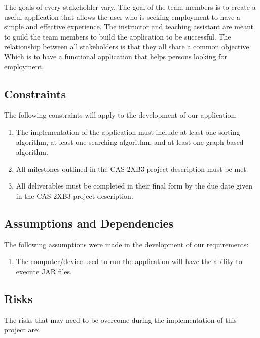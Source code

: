 \documentclass[english]{article}
\begin{document}
\medskip


The goals of every stakeholder vary. The goal of the team members is to create a useful application that allows the user who is seeking employment to have a simple and effective experience. The instructor and teaching assistant are meant to guild the team members to build the application to be successful. The relationship between all stakeholders is that they all share a common objective. Which is to have a functional application that helps persons looking for employment. 




\subsection{Constraints}
\label{sub:constraints}
The following constraints will apply to the development of our application:
\begin{enumerate}
    \item The implementation of the application must include at least one sorting algorithm, at least one searching algorithm, and at least one graph-based algorithm.
	\item All milestones outlined in the CAS 2XB3 project description must be met.
	\item All deliverables must be completed in their final form by the due date given in the CAS 2XB3 project description.
\end{enumerate}

\subsection{Assumptions and Dependencies}
\label{sub:assumptions_and_dependencies}
The following assumptions were made in the development of our requirements:
\begin{enumerate}
	\item The computer/device used to run the application will have the ability to execute JAR files.
\end{enumerate}

\subsection{Risks}

The risks that may need to be overcome during the implementation of this project are:
\end{document}
